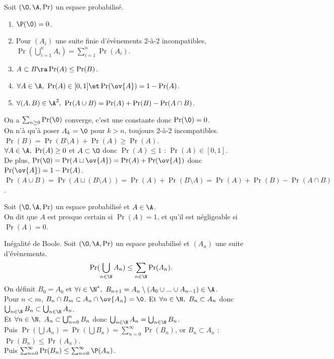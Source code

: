 \documentclass[11pt]{article}
\begin{document}
\begin{prop}{}{}
    Soit $(\O,\A,\Pr)$ un espace probabilisé.
    \begin{enumerate}
        \item $\P(\0)=0$.
        \item Pour $(A_i)$ une suite finie d'évènements 2-à-2 incompatibles, $\Pr(\bigcup_{i=1}^n A_i)=\sum_{i=1}^n\Pr(A_i)$.
        \item $A\subset B \ra \Pr(A) \leq \Pr(B)$.
        \item $\forall A \in \A, ~ \Pr(A) \in [0,1] \et \Pr(\ov{A})=1-\Pr(A)$.
        \item $\forall (A,B) \in \A^2, ~ \Pr(A\cup B)=\Pr(A)+\Pr(B)-\Pr(A\cap B)$.
    \end{enumerate}
    \tcblower
     On a $\sum_{n\geq0}\Pr(\0)$ converge, c'est une constante donc $\Pr(\0)=0$.\\
     On n'à qu'à poser $A_k=\0$ pour $k>n$, toujours 2-à-2 incompatibles.\\
     $\Pr(B)=\Pr(B\setminus A) + \Pr(A) \geq \Pr(A)$.\\
     $\forall A \in \A, ~ \Pr(A)\geq 0$ et $A\subset\O$ donc $\Pr(A)\leq 1$ : $\Pr(A)\in[0,1]$.\\
    De plus, $\Pr(\O)=\Pr(A\sqcup\ov{A})=\Pr(A)+\Pr(\ov{A})$ donc $\Pr(\ov{A})=1-\Pr(A)$.\\
     $\Pr(A\cup B)=\Pr(A\sqcup(B\setminus A))=\Pr(A)+\Pr(B\setminus A)=\Pr(A)+\Pr(B)-\Pr(A\cap B)$.
\end{prop}

\vspace*{-0.8cm}

\begin{defi}{}{}
    Soit $(\O,\A,\Pr)$ un espace probabilisé et $A\in\A$.\\
    On dit que $A$ est presque certain si $\Pr(A)=1$, et qu'il est négligeable si $\Pr(A)=0$.
\end{defi}

\vspace*{-0.9cm}

\begin{prop}{Inégalité de Boole.}{}
    Soit $(\O,\A,\Pr)$ un espace probabilisé et $(A_n)$ une suite d'évènements.
    \begin{equation*}
        \Pr(\bigcup_{n\in\N}A_n) \leq \sum_{n\in\N}\Pr(A_n).
    \end{equation*}
    \tcblower
    On définit $B_0=A_0$ et $\forall i \in \N^*, ~ B_{n+1}=A_n \setminus (A_0 \cup ... \cup A_{n-1}) \in \A$.\\
    Pour $n<m$, $B_n \cap B_m \subset A_n \cap \ov{A_n} = \0$. Et $\forall n \in \N, ~ B_n \subset A_n$ donc $\bigcup_{n\in\N} B_n \subset \bigcup_{n\in\N} A_n$.\\
    Et $\forall n \in \N, ~ A_n \subset \bigcup_{n=0}^n B_n$ donc $\bigcup_{n\in\N} A_n = \bigcup_{n\in\N} B_n$.\\
    Puis $\Pr(\bigcup A_n) = \Pr(\bigcup B_n) = \sum_{n=0}^\infty \Pr(B_n)$, or $B_n \subset A_n$ : $\Pr(B_n) \leq \Pr(A_n)$.\\
    Puis $\sum_{n=0}^{\infty}\Pr(B_n) \leq \sum_{n=0}^{\infty}\P(A_n)$.
\end{prop}
\end{document}
